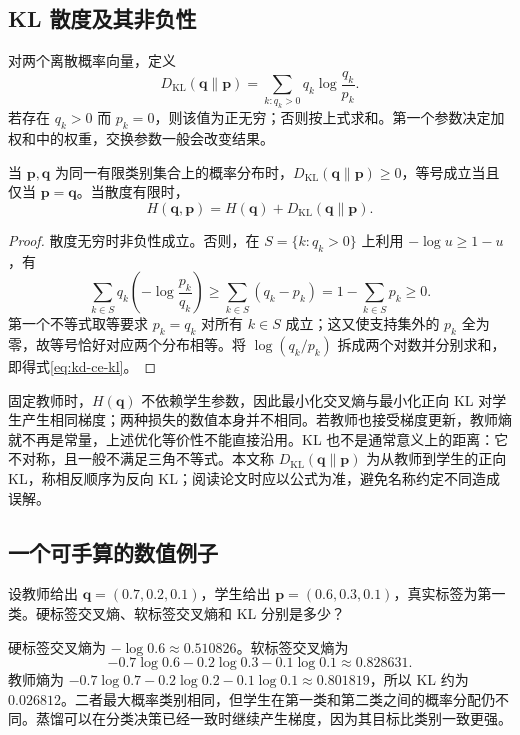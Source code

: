 \documentclass[UTF8,12pt,a4paper,fontset=fandol]{ctexart}
\begin{document}
\subsection{KL 散度及其非负性}
\begin{definition}
对两个离散概率向量，定义
\begin{equation}
 D_{\mathrm{KL}}(\mathbf q\|\mathbf p)
 =\sum_{k:q_k>0}q_k\log\frac{q_k}{p_k}.
 \label{eq:kd-kl}
\end{equation}
若存在 $q_k>0$ 而 $p_k=0$，则该值为正无穷；否则按上式求和。第一个参数决定加权和中的权重，交换参数一般会改变结果。
\end{definition}

\begin{proposition}[非负性和交叉熵分解]
当 $\mathbf p,\mathbf q$ 为同一有限类别集合上的概率分布时，$D_{\mathrm{KL}}(\mathbf q\|\mathbf p)\geq0$，等号成立当且仅当 $\mathbf p=\mathbf q$。当散度有限时，
\begin{equation}
 H(\mathbf q,\mathbf p)=H(\mathbf q)+D_{\mathrm{KL}}(\mathbf q\|\mathbf p).
 \label{eq:kd-ce-kl}
\end{equation}
\end{proposition}
\begin{proof}
散度无穷时非负性成立。否则，在 $S=\{k:q_k>0\}$ 上利用 $-\log u\geq1-u$，有
\[
 \sum_{k\in S}q_k\left(-\log\frac{p_k}{q_k}\right)
 \geq\sum_{k\in S}(q_k-p_k)
 =1-\sum_{k\in S}p_k\geq0.
\]
第一个不等式取等要求 $p_k=q_k$ 对所有 $k\in S$ 成立；这又使支持集外的 $p_k$ 全为零，故等号恰好对应两个分布相等。将 $\log(q_k/p_k)$ 拆成两个对数并分别求和，即得式\eqref{eq:kd-ce-kl}。
\end{proof}

固定教师时，$H(\mathbf q)$ 不依赖学生参数，因此最小化交叉熵与最小化正向 KL 对学生产生相同梯度；两种损失的数值本身并不相同。若教师也接受梯度更新，教师熵就不再是常量，上述优化等价性不能直接沿用。KL 也不是通常意义上的距离：它不对称，且一般不满足三角不等式。本文称 $D_{\mathrm{KL}}(\mathbf q\|\mathbf p)$ 为从教师到学生的正向 KL，称相反顺序为反向 KL；阅读论文时应以公式为准，避免名称约定不同造成误解。

\subsection{一个可手算的数值例子}
\begin{example}[同一正确率下的软分布差异]
设教师给出 $\mathbf q=(0.7,0.2,0.1)$，学生给出 $\mathbf p=(0.6,0.3,0.1)$，真实标签为第一类。硬标签交叉熵、软标签交叉熵和 KL 分别是多少？
\end{example}
\begin{solve}
硬标签交叉熵为 $-\log0.6\approx0.510826$。软标签交叉熵为
\[
 -0.7\log0.6-0.2\log0.3-0.1\log0.1\approx0.828631.
\]
教师熵为 $-0.7\log0.7-0.2\log0.2-0.1\log0.1\approx0.801819$，所以 KL 约为 $0.026812$。二者最大概率类别相同，但学生在第一类和第二类之间的概率分配仍不同。蒸馏可以在分类决策已经一致时继续产生梯度，因为其目标比类别一致更强。
\end{solve}
\end{document}
